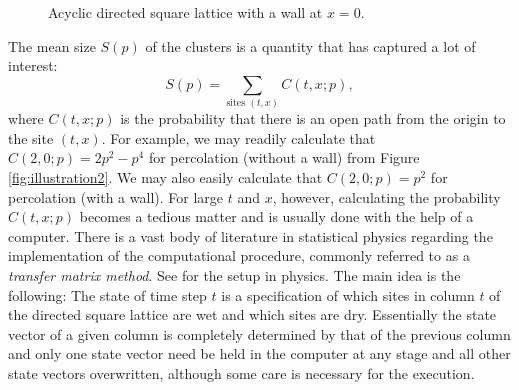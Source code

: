 \documentclass[numbers=enddot,12pt,final,onecolumn,notitlepage]{scrartcl}%
\theoremstyle{definition}
\begin{document}
\begin{figure}[htbp]
\begin{center}
\end{center}
\caption{Acyclic directed square lattice with a wall at $x=0$.}\label{fig:illustration3}
\end{figure}

The mean size $S(p)$ of the clusters is a quantity that has captured a lot of interest:
\begin{equation*}
S(p) = \sum_{\text{sites }(t, x)} C(t, x; p),
\end{equation*}
where $C(t, x; p)$ is the probability that there is an open path from the origin to the site $(t, x)$. For example, we may readily calculate that $C(2, 0; p)=2p^2-p^4$ for percolation (without a wall) from Figure \ref{fig:illustration2}. We may also easily calculate that $C(2, 0; p)=p^2$ for percolation (with a wall). For large $t$ and $x$, however, calculating the probability $C(t, x; p)$ becomes a tedious matter and is usually done with the help of a computer. There is a vast body of literature in statistical physics regarding the implementation of the computational procedure, commonly referred to as a \emph{transfer matrix method}. See \cite{Ble77} for the setup in physics. The main idea is the following: The state of time step $t$ is a specification of which sites in column $t$ of the directed square lattice are wet and which sites are dry. Essentially the state vector of a given column is completely determined by that of the previous column and only one state vector need be held in the computer at any stage and all other state vectors overwritten, although some care is necessary for the execution.
\end{document}
